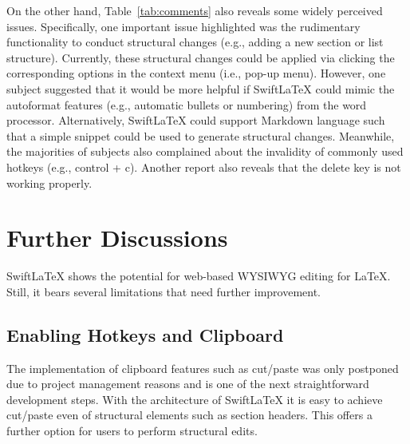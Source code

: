 \documentclass[sigconf]{acmart}
\begin{document}
On the other hand, Table~\ref{tab:comments} also reveals some widely perceived issues. Specifically, one important issue highlighted was the rudimentary functionality to conduct structural changes (e.g., adding a new section or list structure). 
Currently, these structural changes could be applied via clicking the corresponding options in the context menu (i.e., pop-up menu).
However, one subject suggested that it would be more helpful if SwiftLaTeX could mimic the autoformat features (e.g., automatic bullets or numbering) from the word processor. 
Alternatively, SwiftLaTeX could support Markdown language such that a simple snippet could be used to generate structural changes.
Meanwhile, the majorities of subjects also complained about the invalidity of commonly used hotkeys (e.g., control + c). Another report also reveals that the delete key is not working properly.

	
\section{Further Discussions}
SwiftLaTeX shows the potential for web-based WYSIWYG editing for \LaTeX. Still, it bears several limitations that need further improvement.

\subsection{Enabling Hotkeys and Clipboard}
The implementation of clipboard features such as cut/paste was only postponed due to project management reasons and is one of the next straightforward development steps. With the architecture of SwiftLaTeX it is easy to achieve cut/paste even of structural elements such as section headers. This offers a further option for users to perform structural edits. 
\end{document}
